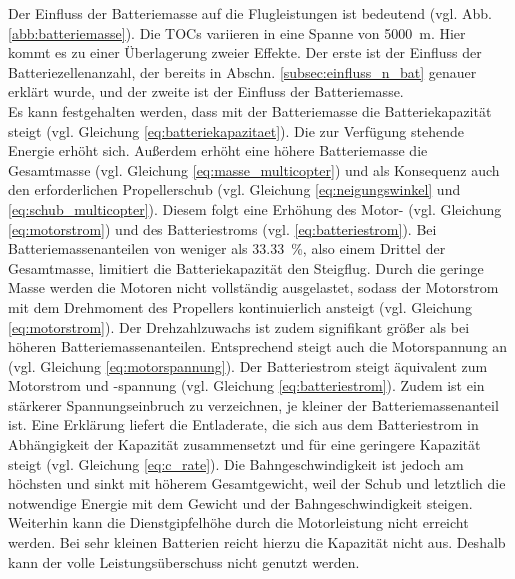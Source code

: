 Der Einfluss der Batteriemasse auf die Flugleistungen ist bedeutend (vgl. Abb. \ref{abb:batteriemasse}). Die TOCs variieren in eine Spanne von \SI{5000}{m}. Hier kommt es zu einer Überlagerung zweier Effekte. Der erste ist der Einfluss der Batteriezellenanzahl, der bereits in Abschn. \ref{subsec:einfluss_n_bat} genauer erklärt wurde, und der zweite ist der Einfluss der Batteriemasse. \\
Es kann festgehalten werden, dass mit der Batteriemasse die Batteriekapazität steigt (vgl. Gleichung \eqref{eq:batteriekapazitaet}). Die zur Verfügung stehende Energie erhöht sich. Außerdem erhöht eine höhere Batteriemasse die Gesamtmasse (vgl. Gleichung \eqref{eq:masse_multicopter}) und als Konsequenz auch den erforderlichen Propellerschub (vgl. Gleichung \ref{eq:neigungswinkel} und \ref{eq:schub_multicopter}). Diesem folgt eine Erhöhung des Motor- (vgl. Gleichung \ref{eq:motorstrom}) und des Batteriestroms (vgl. \ref{eq:batteriestrom}).
Bei Batteriemassenanteilen von weniger als \SI{33,33}{\%}, also einem Drittel der Gesamtmasse, limitiert die Batteriekapazität den Steigflug. Durch die geringe Masse werden die Motoren nicht vollständig ausgelastet, sodass der Motorstrom mit dem Drehmoment des Propellers kontinuierlich ansteigt (vgl. Gleichung \ref{eq:motorstrom}). Der Drehzahlzuwachs ist zudem signifikant größer als bei höheren Batteriemassenanteilen. Entsprechend steigt auch die Motorspannung an (vgl. Gleichung \ref{eq:motorspannung}). Der Batteriestrom steigt äquivalent zum Motorstrom und -spannung (vgl. Gleichung \ref{eq:batteriestrom}).
Zudem ist ein stärkerer Spannungseinbruch zu verzeichnen, je kleiner der Batteriemassenanteil ist. Eine Erklärung liefert die Entladerate, die sich aus dem Batteriestrom in Abhängigkeit der Kapazität zusammensetzt und für eine geringere Kapazität steigt (vgl. Gleichung \ref{eq:c_rate}). Die Bahngeschwindigkeit ist jedoch am höchsten und sinkt mit höherem Gesamtgewicht, weil der Schub und letztlich die notwendige Energie mit dem Gewicht und der Bahngeschwindigkeit steigen. 
Weiterhin kann die Dienstgipfelhöhe durch die Motorleistung nicht erreicht werden. Bei sehr kleinen Batterien reicht hierzu die Kapazität nicht aus. Deshalb kann der volle Leistungsüberschuss nicht genutzt werden. 
